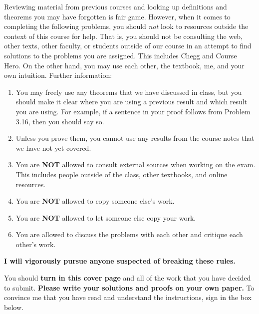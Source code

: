 \documentclass[11pt]{article}
\theoremstyle{definition}
\begin{document}
\bigskip

Reviewing material from previous courses and looking up definitions and theorems you may have forgotten is fair game. However, when it comes to completing the following problems, you should \emph{not} look to resources outside the context of this course for help.  That is, you should not be consulting the web, other texts, other faculty, or students outside of our course in an attempt to find solutions to the problems you are assigned.  This includes Chegg and Course Hero. On the other hand, you may use each other, the textbook, me, and your own intuition. Further information:
\begin{enumerate}
\item You may freely use any theorems that we have discussed in class, but you should make it clear where you are using a previous result and which result you are using.  For example, if a sentence in your proof follows from Problem 3.16, then you should say so.
\item Unless you prove them, you cannot use any results from the course notes that we have not yet covered.
\item You are \textbf{NOT} allowed to consult external sources when working on the exam.  This includes people outside of the class, other textbooks, and online resources.
\item You are \textbf{NOT} allowed to copy someone else's work.
\item You are \textbf{NOT} allowed to let someone else copy your work.
\item You are allowed to discuss the problems with each other and critique each other's work.
\end{enumerate}

\begin{center}
\textbf{I will vigorously pursue anyone suspected of breaking these rules.}
\end{center}

You should \textbf{turn in this cover page} and all of the work that you have decided to submit. \textbf{Please write your solutions and proofs on your own paper.} To convince me that you have read and understand the instructions, sign in the box below.

\bigskip


\bigskip
\end{document}
